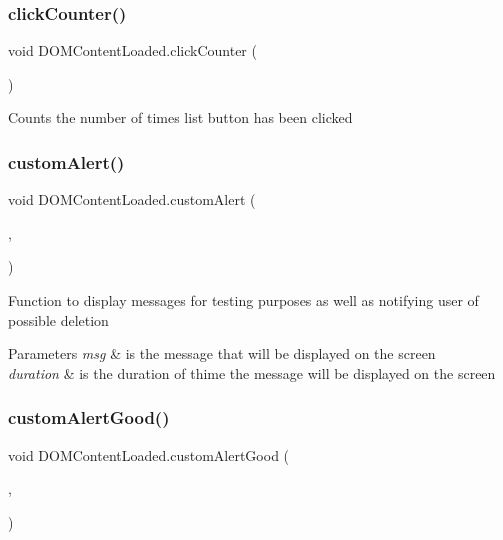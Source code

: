\subsubsection{\texorpdfstring{click\+Counter()}{clickCounter()}}
{\footnotesize\ttfamily void D\+O\+M\+Content\+Loaded.\+click\+Counter (\begin{DoxyParamCaption}{ }\end{DoxyParamCaption})\hspace{0.3cm}{\ttfamily [inline]}}

Counts the number of times list button has been clicked \mbox{\label{class_d_o_m_content_loaded_ab11d12ac2eac7f2fce7f06c31917594e}} 
\subsubsection{\texorpdfstring{custom\+Alert()}{customAlert()}}
{\footnotesize\ttfamily void D\+O\+M\+Content\+Loaded.\+custom\+Alert (\begin{DoxyParamCaption}\item[{msg}]{,  }\item[{duration}]{ }\end{DoxyParamCaption})\hspace{0.3cm}{\ttfamily [inline]}}

Function to display messages for testing purposes as well as notifying user of possible deletion 
\begin{DoxyParams}{Parameters}
{\em msg} & is the message that will be displayed on the screen \\
\hline
{\em duration} & is the duration of thime the message will be displayed on the screen \\
\hline
\end{DoxyParams}
\mbox{\label{class_d_o_m_content_loaded_a838d84f4bc0238418ceee1cc4bffd1ea}} 
\subsubsection{\texorpdfstring{custom\+Alert\+Good()}{customAlertGood()}}
{\footnotesize\ttfamily void D\+O\+M\+Content\+Loaded.\+custom\+Alert\+Good (\begin{DoxyParamCaption}\item[{msg}]{,  }\item[{duration}]{ }\end{DoxyParamCaption})\hspace{0.3cm}{\ttfamily [inline]}}

